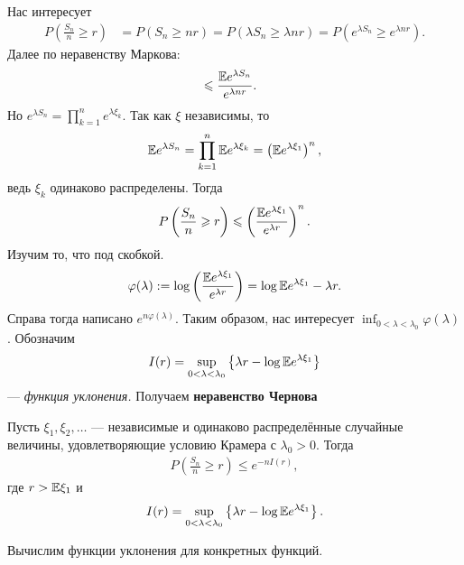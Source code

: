 \documentclass[../main.tex]{subfiles}
\begin{document}
Нас интересует
\begin{align*}
 P \left( \frac{S_n}{n} \geqslant r \right) &= P ( S_n \geqslant nr) = P (\lambda S_n \geqslant \lambda n r) = P(e^{\lambda S_n} \geqslant e^{\lambda n r}).
\end{align*} Далее по неравенству Маркова:
\begin{align*}
 &\leqslant \frac{\mathbb E e^{\lambda S_n}}{e^{\lambda n r}}.
\end{align*} Но $ e^{\lambda S_n} = \prod_{k=1}^{n}e^{\lambda \xi_k}  $. Так как $ \xi $ независимы, то
\begin{align*}
 \mathbb E e^{\lambda S_n} = \prod_{k=1}^{n} \mathbb E e^{\lambda \xi_k} = \left( \mathbb E e^{\lambda \xi_1} \right)^{n},
\end{align*} ведь $ \xi_k $ одинаково распределены. Тогда
\begin{align*}
 P\left(\frac{S_n}{n}\geqslant r\right)\leqslant \left( \frac{\mathbb E e ^{\lambda \xi_1}}{e^{\lambda r}} \right)^{n}.
\end{align*} Изучим то, что под скобкой.
\begin{align*}
 \varphi(\lambda) := \log \left( \frac{\mathbb E e^{\lambda \xi_1}}{e^{\lambda r}} \right) = \log \mathbb E e^{\lambda \xi_1} - \lambda r.
\end{align*} Справа тогда написано $ e^{n\varphi(\lambda)} $. Таким образом, нас интересует $ \inf_{0 < \lambda < \lambda_0} \varphi(\lambda) $. Обозначим
\begin{align*}
 I(r) =  \sup_{0 < \lambda < \lambda_0} \left\{ \lambda r - \log \mathbb E e^{\lambda \xi_1} \right\}
\end{align*} --- \textit{функция уклонения.} Получаем \textbf{неравенство Чернова}
\begin{prop}
 Пусть $ \xi_1, \xi_2, \ldots $ --- независимые и одинаково распределённые случайные величины, удовлетворяющие условию Крамера с $ \lambda_0 > 0 $. Тогда
 \begin{align*}
  P \left( \frac{S_n}{n} \geqslant r \right) \leqslant e^{-nI(r)},
 \end{align*} где $ r > \mathbb E \xi_1 $ и
 \begin{align*}
  I(r) = \sup_{0 < \lambda < \lambda_0} \left\{ \lambda r - \log \mathbb E e^{\lambda\xi_1}  \right\}.
 \end{align*}
\end{prop}

Вычислим функции уклонения для конкретных функций.
\end{document}
